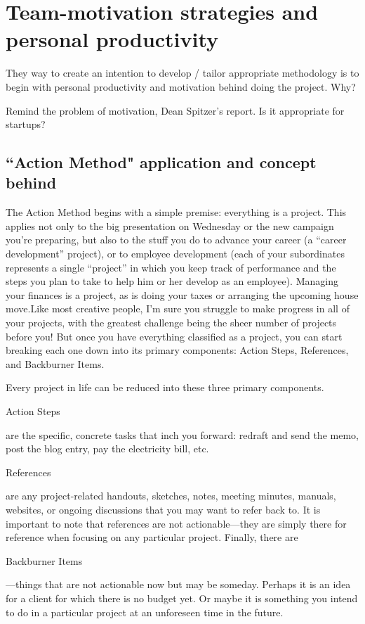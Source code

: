 \chapter{Team-motivation strategies and personal productivity}

They way to create an intention to develop / tailor appropriate methodology is to begin with personal productivity and motivation behind doing the project. Why?

Remind the problem of motivation, Dean Spitzer's report. Is it appropriate for startups?

\section{``Action Method" application and concept behind}

The Action Method begins with a simple premise: everything is a project. This applies not only to the big presentation on Wednesday or the new campaign you’re preparing, but also to the stuff you do to advance your career (a “career development” project), or to employee development (each of your subordinates represents a single “project” in which you keep track of performance and the steps you plan to take to help him or her develop as an employee). Managing your finances is a project, as is doing your taxes or arranging the upcoming house move.Like most creative people, I’m sure you struggle to make progress in all of your projects, with the greatest challenge being the sheer number of projects before you! But once you have everything classified as a project, you can start breaking each one down into its primary components: Action Steps, References, and Backburner Items.


Every project in life can be reduced into these three primary components.

Action Steps

are the specific, concrete tasks that inch you forward: redraft and send the memo, post the blog entry, pay the electricity bill, etc.

References

are any project-related handouts, sketches, notes, meeting minutes, manuals, websites, or ongoing discussions that you may want to refer back to. It is important to note that references are not actionable—they are simply there for reference when focusing on any particular project. Finally, there are

Backburner Items

—things that are not actionable now but may be someday. Perhaps it is an idea for a client for which there is no budget yet. Or maybe it is something you intend to do in a particular project at an unforeseen time in the future.

